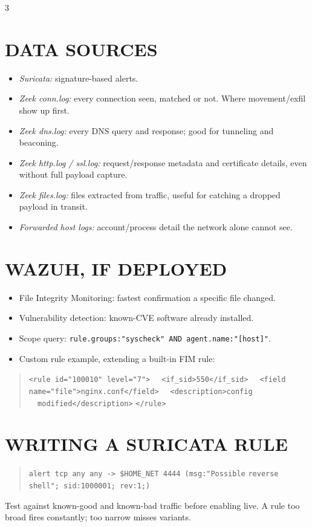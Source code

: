 \documentclass[7pt,landscape]{article}
\begin{document}
\begin{multicols*}{3}
\section{DATA SOURCES}
\begin{itemize}
    \item \textit{Suricata:} signature-based alerts.
    \item \textit{Zeek conn.log:} every connection seen, matched or not. Where movement/exfil show up first.
    \item \textit{Zeek dns.log:} every DNS query and response; good for tunneling and beaconing.
    \item \textit{Zeek http.log / ssl.log:} request/response metadata and certificate details, even without full payload capture.
    \item \textit{Zeek files.log:} files extracted from traffic, useful for catching a dropped payload in transit.
    \item \textit{Forwarded host logs:} account/process detail the network alone cannot see.
\end{itemize}

\section{WAZUH, IF DEPLOYED}
\begin{itemize}
    \item File Integrity Monitoring: fastest confirmation a specific file changed.
    \item Vulnerability detection: known-CVE software already installed.
    \item Scope query: \texttt{rule.groups:"syscheck" AND agent.name:"[host]"}.
    \item Custom rule example, extending a built-in FIM rule:
\end{itemize}
\begin{quote}
\footnotesize
\texttt{<rule id="100010" level="7">} \newline
\texttt{~~<if\_sid>550</if\_sid>} \newline
\texttt{~~<field name="file">nginx.conf</field>} \newline
\texttt{~~<description>config} \newline
\texttt{~~modified</description>} \newline
\texttt{</rule>}
\normalsize
\end{quote}

\section{WRITING A SURICATA RULE}
\begin{quote}
\texttt{alert tcp any any -> \$HOME\_NET 4444 (msg:"Possible} \newline \texttt{reverse shell"; sid:1000001; rev:1;)}
\end{quote}
Test against known-good and known-bad traffic before enabling live. A rule too broad fires constantly; too narrow misses variants.


\end{multicols*}
\end{document}
